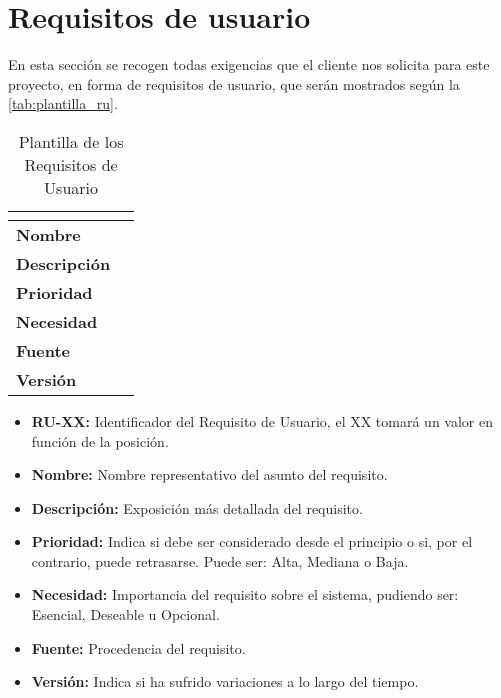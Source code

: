 \section{Requisitos de usuario}\label{sec:requisitos-de-usuario}
En esta sección se recogen todas exigencias que el cliente nos solicita para este proyecto, en forma de requisitos de usuario, que serán mostrados según la \autoref{tab:plantilla_ru}.
\begin{table}[H]
	\centering
	\caption{Plantilla de los Requisitos de Usuario}
	\label{tab:plantilla_ru}
	\begin{tabular}{|l|p{}|}
		\hline
		\multicolumn{2}{|c|}{\cellcolor[HTML]{BFBFBF}{\color[HTML]{000000} \textbf{RU-XX}}} \\ \hline
		\textbf{Nombre}      &   \\ \hline
		\textbf{Descripción} &   \\ \hline
		\textbf{Prioridad}   &   \\ \hline
		\textbf{Necesidad}   &   \\ \hline
		\textbf{Fuente}      &   \\ \hline
		\textbf{Versión}     &   \\ \hline
	\end{tabular}
\end{table}
\begin{itemize}
	\item \textbf{RU-XX:} Identificador del Requisito de Usuario, el XX tomará un valor en función de la posición.
	\item \textbf{Nombre:} Nombre representativo del asunto del requisito.
	\item \textbf{Descripción:} Exposición más detallada del requisito.
	\item \textbf{Prioridad:} Indica si debe ser considerado desde el principio o si, por el contrario, puede retrasarse. Puede ser: Alta, Mediana o Baja.
	\item \textbf{Necesidad:} Importancia del requisito sobre el sistema, pudiendo ser: Esencial, Deseable u Opcional.
	\item \textbf{Fuente:} Procedencia del requisito.
	\item \textbf{Versión:} Indica si ha sufrido variaciones a lo largo del tiempo.
\end{itemize}

